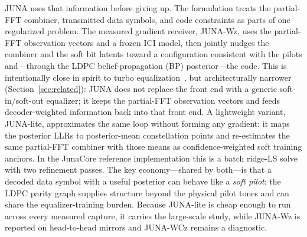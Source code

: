 \documentclass[journal]{IEEEtran}
\newcommand{\juna}{JUNA}
\newcommand{\junalite}{JUNA-lite}
\newcommand{\junawz}{JUNA-Wz}
\newcommand{\junawcz}{JUNA-WCz}
\begin{document}
\juna{} uses that information before giving up. The formulation treats the
partial-FFT combiner, transmitted data symbols, and code constraints as parts of
one regularized problem. The measured gradient receiver, \junawz{}, uses the
partial-FFT observation vectors and a frozen ICI model, then jointly nudges the
combiner and the soft bit latents toward a configuration consistent with the
pilots and---through the LDPC belief-propagation (BP) posterior---the code. This
is intentionally close in spirit to turbo equalization~\cite{douillard1995turbo,
tuchler2002turbo,jhuang2011progressive}, but architecturally narrower
(Section~\ref{sec:related}): \juna{} does not replace the front end with a
generic soft-in/soft-out equalizer; it keeps the partial-FFT observation
vectors and feeds decoder-weighted information back into that front end. A lightweight variant,
\junalite{}, approximates the same loop without forming any gradient: it maps
the posterior LLRs to posterior-mean constellation points and re-estimates the
same partial-FFT combiner with those means as confidence-weighted soft training
anchors. In the JunaCore reference implementation this is a batch ridge-LS
solve with two refinement passes. The key economy---shared by both---is that a decoded data symbol with a
useful posterior can behave like a \emph{soft pilot}: the LDPC parity graph
supplies structure beyond the physical pilot tones and can share the
equalizer-training burden. Because \junalite{} is cheap enough to run across
every measured capture, it carries the large-scale study, while \junawz{} is
reported on head-to-head mirrors and \junawcz{} remains a diagnostic.
\end{document}
